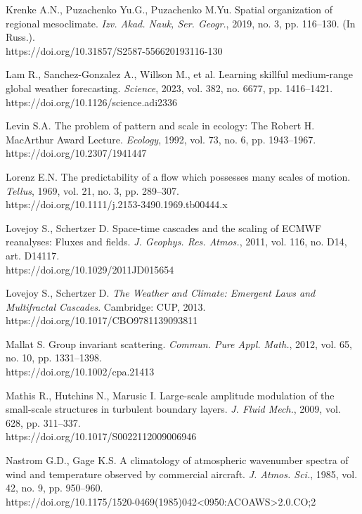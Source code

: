 \documentclass[12pt,a4paper]{article}
\begin{document}
\noindent Krenke A.N., Puzachenko Yu.G., Puzachenko M.Yu. Spatial organization of regional mesoclimate. \textit{Izv. Akad. Nauk, Ser. Geogr.}, 2019, no. 3, pp. 116–130. (In Russ.).\\ https://doi.org/10.31857/S2587-556620193116-130

\noindent Lam R., Sanchez-Gonzalez A., Willson M., et al. Learning skillful medium-range global weather forecasting. \textit{Science}, 2023, vol. 382, no. 6677, pp. 1416–1421.\\ https://doi.org/10.1126/science.adi2336

\noindent Levin S.A. The problem of pattern and scale in ecology: The Robert H. MacArthur Award Lecture. \textit{Ecology}, 1992, vol. 73, no. 6, pp. 1943–1967.\\ https://doi.org/10.2307/1941447

\noindent Lorenz E.N. The predictability of a flow which possesses many scales of motion. \textit{Tellus}, 1969, vol. 21, no. 3, pp. 289–307.\\ https://doi.org/10.1111/j.2153-3490.1969.tb00444.x

\noindent Lovejoy S., Schertzer D. Space-time cascades and the scaling of ECMWF reanalyses: Fluxes and fields. \textit{J. Geophys. Res. Atmos.}, 2011, vol. 116, no. D14, art. D14117.\\ https://doi.org/10.1029/2011JD015654

\noindent Lovejoy S., Schertzer D. \textit{The Weather and Climate: Emergent Laws and Multifractal Cascades}. Cambridge: CUP, 2013.\\ https://doi.org/10.1017/CBO9781139093811

\noindent Mallat S. Group invariant scattering. \textit{Commun. Pure Appl. Math.}, 2012, vol. 65, no. 10, pp. 1331–1398.\\ https://doi.org/10.1002/cpa.21413

\noindent Mathis R., Hutchins N., Marusic I. Large-scale amplitude modulation of the small-scale structures in turbulent boundary layers. \textit{J. Fluid Mech.}, 2009, vol. 628, pp. 311–337.\\ https://doi.org/10.1017/S0022112009006946

\noindent Nastrom G.D., Gage K.S. A climatology of atmospheric wavenumber spectra of wind and temperature observed by commercial aircraft. \textit{J. Atmos. Sci.}, 1985, vol. 42, no. 9, pp. 950–960.\\ https://doi.org/10.1175/1520-0469(1985)042<0950:ACOAWS>2.0.CO;2
\end{document}
